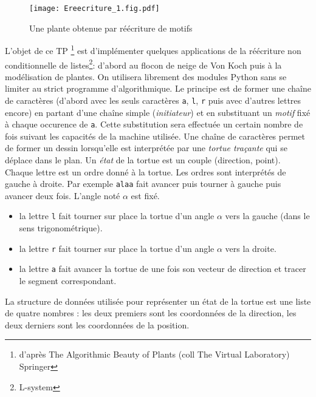 
\begin{figure}
 \centering
 \texttt{[image: Ereecriture\_1.fig.pdf]}
 \caption{Une plante obtenue par réécriture de motifs}
 \label{fig:Ereecriture_1}
\end{figure}

L'objet de ce TP \footnote{d'après The Algorithmic Beauty of Plants (coll The Virtual Laboratory) Springer} est d'implémenter quelques applications de la réécriture non conditionnelle de listes\footnote{L-system}: d'abord au flocon de neige de Von Koch puis à la modélisation de plantes.\newline
On utilisera librement des modules Python sans se limiter au strict programme d'algorithmique. \newline
Le principe est de former une chaîne de caractères (d'abord avec les seuls caractères \verb|a|, \verb|l|, \verb|r| puis avec d'autres lettres encore) en partant d'une chaîne simple (\emph{initiateur}) et en substituant un \emph{motif} fixé à chaque occurence de \verb|a|. Cette substitution sera effectuée un certain nombre de fois suivant les capacités de la machine utilisée.\newline
Une chaîne de caractères permet de former un dessin lorsqu'elle est interprétée par une \emph{tortue traçante} qui se déplace dans le plan. Un \emph{état} de la tortue est un couple (direction, point).\newline
Chaque lettre est un ordre donné à la tortue. Les ordres sont interprétés de gauche à droite. Par exemple \verb|alaa| fait avancer puis tourner à gauche puis avancer deux fois. L'angle noté $\alpha$ est fixé.
\begin{itemize}
 \item la lettre \verb|l|  fait tourner sur place la tortue d'un angle $\alpha$ vers la gauche (dans le sens trigonométrique).
\item la lettre \verb|r|  fait tourner sur place la tortue d'un angle $\alpha$ vers la droite.
\item la lettre \verb|a|  fait avancer  la tortue de une fois son vecteur de direction et tracer le segment correspondant.
\end{itemize}
La structure de données utilisée pour représenter un état de la tortue est une liste de quatre nombres : les deux premiers sont les coordonnées de la direction, les deux derniers sont les coordonnées de la position.
